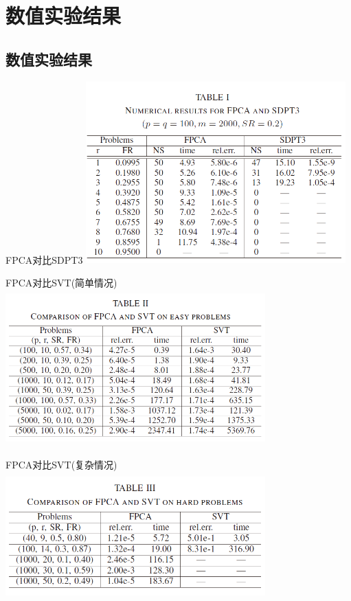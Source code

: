\documentclass[slidestop, compress, mathserif, UTF8]{beamer}
\numberwithin{equation}{section}                                        %
\begin{document}
	\section{数值实验结果}\label{section5}
		\subsection{数值实验结果}
			\begin{frame}[t]{FPCA对比SDPT3}
				\centering
					\includegraphics[width=10cm,height=7cm]{src//1.png}
			\end{frame}
			\begin{frame}[t]{FPCA对比SVT(简单情况)}
				\centering
					\includegraphics[width=10cm,height=6cm]{src//2.png}
			\end{frame}
			\begin{frame}[t]{FPCA对比SVT(复杂情况)}
				\vspace{10mm}
				\centering
					\includegraphics[width=10cm,height=5cm]{src//3.png}
			\end{frame}
\end{document}
